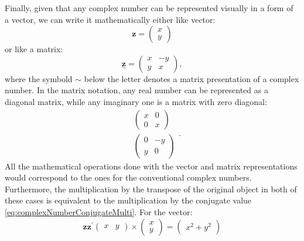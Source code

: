 \documentclass[
]{book}
\begin{document}
Finally, given that any complex number can be represented visually in a form of a vector, we can write it mathematically either like vector:
\begin{equation}
    \boldsymbol{z} = \begin{pmatrix} x \\ y \end{pmatrix}
    \label{eq:complexNumberVectors}
\end{equation}
or like a matrix:
\begin{equation}
    \underset{\sim}{\boldsymbol{z}} = \begin{pmatrix} x & -y \\ y & x \end{pmatrix} ,
    \label{eq:complexNumberMatrix}
\end{equation}
where the symbold \(\sim\) below the letter denotes a matrix presentation of a complex number. In the matrix notation, any real number can be represented as a diagonal matrix, while any imaginary one is a matrix with zero diagonal:
\begin{equation*}
    \begin{aligned}
        & \begin{pmatrix} x & 0 \\ 0 & x \end{pmatrix} \\
        & \begin{pmatrix} 0 & -y \\ y & 0 \end{pmatrix}
    \end{aligned} .
\end{equation*}
All the mathematical operations done with the vector and matrix representations would correspond to the ones for the conventional complex numbers. Furthermore, the multiplication by the transpose of the original object in both of these cases is equivalent to the multiplication by the conjugate value \eqref{eq:complexNumberConjugateMulti}. For the vector:
\begin{equation}
    \boldsymbol{z} \boldsymbol{z}^\prime \begin{pmatrix} x & y \end{pmatrix} \times \begin{pmatrix} x \\ y \end{pmatrix} = \begin{pmatrix} x^2 + y^2 \end{pmatrix}
    \label{eq:complexNumberVectorsMulti}
\end{equation}
\end{document}
